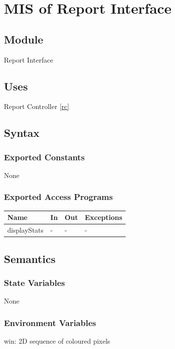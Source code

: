\documentclass[12pt, titlepage]{article}
\begin{document}
\section{MIS of Report Interface} \label{ri}

\subsection{Module}

Report Interface

\subsection{Uses}

Report Controller \ref{rc}

\subsection{Syntax}

\subsubsection{Exported Constants}
None
\subsubsection{Exported Access Programs}

\begin{center}
\begin{tabular}{p{2cm} p{4cm} p{4cm} p{2cm}}
\hline
\textbf{Name} & \textbf{In} & \textbf{Out} & \textbf{Exceptions} \\
\hline
displayStats & - & - & - \\
\hline
\end{tabular}
\end{center}

\subsection{Semantics}

\subsubsection{State Variables}
None
\subsubsection{Environment Variables}
win: 2D sequence of coloured pixels
\end{document}
